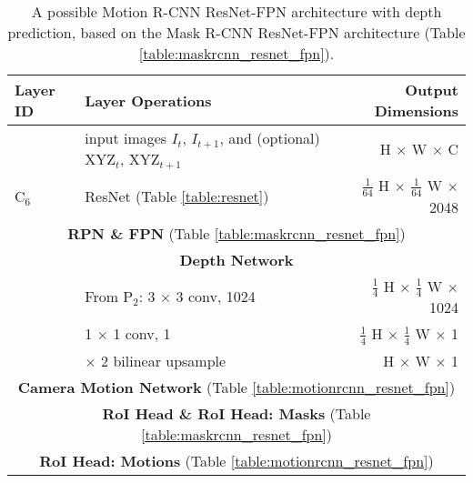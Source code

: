 {
\begin{table}[h]
\centering
\begin{tabular}{llr}
\toprule
\textbf{Layer ID} & \textbf{Layer Operations} & \textbf{Output Dimensions} \\
\midrule\midrule
& input images $I_t$, $I_{t+1}$, and (optional) XYZ$_{t}$, XYZ$_{t+1}$ & H $\times$ W $\times$ C \\
\midrule
C$_6$ & ResNet (Table \ref{table:resnet}) & $\tfrac{1}{64}$ H $\times$ $\tfrac{1}{64}$ W $\times$ 2048 \\
\midrule
\multicolumn{3}{c}{\textbf{RPN \& FPN} (Table \ref{table:maskrcnn_resnet_fpn})} \\
\midrule
\multicolumn{3}{c}{\textbf{Depth Network}}\\
\midrule
& From P$_2$: 3 $\times$ 3 conv, 1024 & $\tfrac{1}{4}$ H $\times$ $\tfrac{1}{4}$ W $\times$ 1024 \\
& 1 $\times$ 1 conv, 1 & $\tfrac{1}{4}$ H $\times$ $\tfrac{1}{4}$ W $\times$ 1 \\
& $\times$ 2 bilinear upsample & H $\times$ W $\times$ 1 \\
\midrule
\multicolumn{3}{c}{\textbf{Camera Motion Network} (Table \ref{table:motionrcnn_resnet_fpn})}\\
\midrule
\multicolumn{3}{c}{\textbf{RoI Head \& RoI Head: Masks} (Table \ref{table:maskrcnn_resnet_fpn})} \\
\midrule
\multicolumn{3}{c}{\textbf{RoI Head: Motions} (Table \ref{table:motionrcnn_resnet_fpn})}\\
\bottomrule
\end{tabular}

\caption {
A possible Motion R-CNN ResNet-FPN architecture with depth prediction,
based on the Mask R-CNN ResNet-FPN architecture (Table \ref{table:maskrcnn_resnet_fpn}).
}
\label{table:motionrcnn_resnet_fpn_depth}
\end{table}
}
